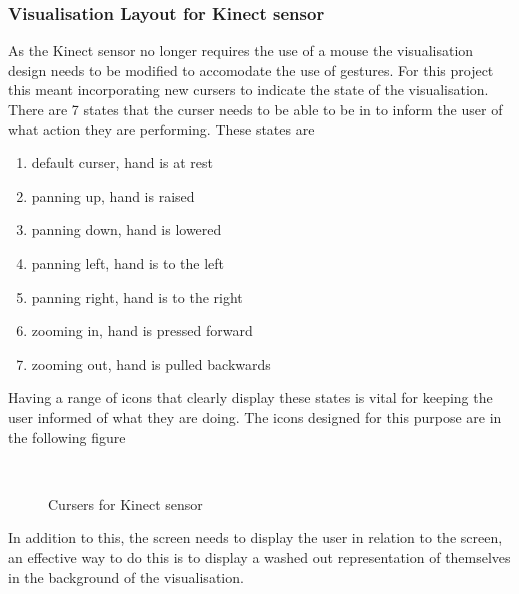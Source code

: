 \subsubsection{Visualisation Layout for Kinect sensor}
As the Kinect sensor no longer requires the use of a mouse the visualisation design needs to be modified to accomodate the use of gestures. For this project this meant incorporating new cursers to indicate the state of the visualisation. There are 7 states that the curser needs to be able to be in to inform the user of what action they are performing. These states are

\begin{enumerate}
 \item default curser, hand is at rest
 \item panning up, hand is raised
 \item panning down, hand is lowered
 \item panning left, hand is to the left
 \item panning right, hand is to the right
 \item zooming in, hand is pressed forward
 \item zooming out, hand is pulled backwards
\end{enumerate}

Having a range of icons that clearly display these states is vital for keeping the user informed of what they are doing. The icons designed for this purpose are in the following figure

\begin{figure}[h!]
  \centering
  ~
  \caption{Cursers for Kinect sensor}  
\end{figure}

In addition to this, the screen needs to display the user in relation to the screen, an effective way to do this is to display a washed out representation of themselves in the background of the visualisation. 